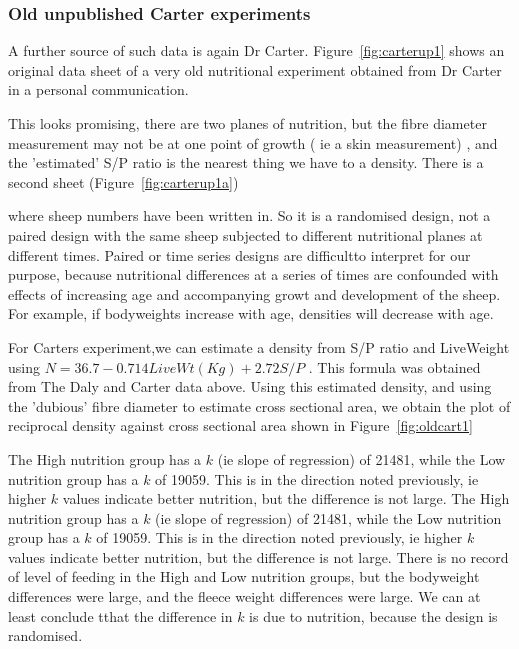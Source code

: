 \documentclass[titlepage]{article}  %
\begin{document}
\clearpage
\subsubsection{Old unpublished Carter experiments}
A further source of such data is again Dr Carter. Figure~\ref{fig:carterup1} shows an original data sheet of a very old nutritional experiment obtained from Dr Carter in a personal communication. 

This looks promising, there are two planes of nutrition, but the fibre diameter measurement may not be at one point of growth ( ie a skin measurement) , and the 'estimated' S/P ratio is the nearest thing we have to a density. There is a second sheet (Figure~\ref{fig:carterup1a})

where sheep numbers have been written in. So it is a randomised design, not a paired design with the same sheep subjected to different nutritional planes at different times. Paired or time series designs are difficultto interpret for our purpose, because nutritional differences at a series of times are confounded with effects of increasing age  and accompanying growt and development of the sheep. For example, if bodyweights increase with age, densities will decrease with age.

For Carters experiment,we can estimate a density from S/P ratio and LiveWeight using $N = 36.7 - 0.714 LiveWt(Kg) + 2.72S/P$ . This formula was obtained from The Daly and Carter data above.
Using this estimated density, and using the 'dubious' fibre diameter to estimate cross sectional area, we obtain the plot of reciprocal density against cross sectional area shown in Figure~\ref{fig:oldcart1}

The High nutrition group has a $k$ (ie slope of regression) of 21481, while the Low nutrition group has a $k$ of 19059. This is in the direction noted previously, ie higher $k$ values indicate better nutrition, but the difference is not large. 
The High nutrition group has a $k$ (ie slope of regression) of 21481, while the Low nutrition group has a $k$ of 19059. This is in the direction noted previously, ie higher $k$ values indicate better nutrition, but the difference is not large. There is no record of level of feeding in the High and Low nutrition groups, but the bodyweight differences were large, and the fleece weight differences were large. We can at least conclude tthat the difference in $k$ is due to nutrition, because the design is randomised. 
\end{document}
